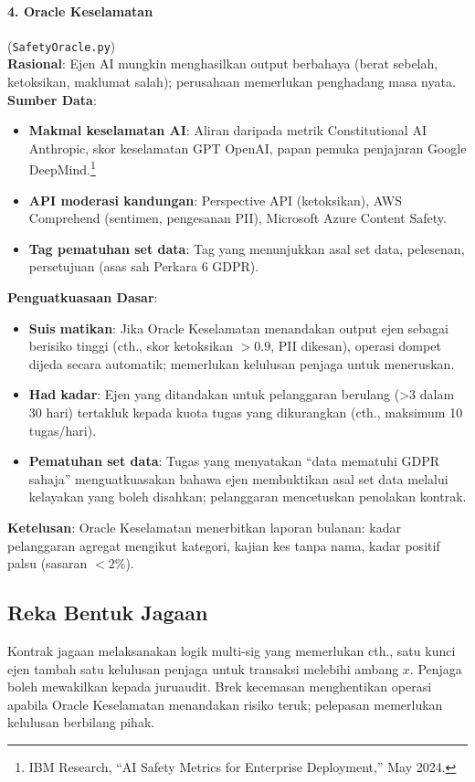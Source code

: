 \documentclass[11pt]{article}
\begin{document}
\paragraph{4. Oracle Keselamatan} (\texttt{SafetyOracle.py})\\
\textbf{Rasional}: Ejen AI mungkin menghasilkan output berbahaya (berat sebelah, ketoksikan, maklumat salah); perusahaan memerlukan penghadang masa nyata.\\
\textbf{Sumber Data}:
\begin{itemize}[noitemsep]
  \item \textbf{Makmal keselamatan AI}: Aliran daripada metrik Constitutional AI Anthropic, skor keselamatan GPT OpenAI, papan pemuka penjajaran Google DeepMind.\footnote{IBM Research, ``AI Safety Metrics for Enterprise Deployment,'' May 2024.}
  \item \textbf{API moderasi kandungan}: Perspective API (ketoksikan), AWS Comprehend (sentimen, pengesanan PII), Microsoft Azure Content Safety.
  \item \textbf{Tag pematuhan set data}: Tag yang menunjukkan asal set data, pelesenan, persetujuan (asas sah Perkara 6 GDPR).
\end{itemize}
\textbf{Penguatkuasaan Dasar}:
\begin{itemize}[noitemsep]
  \item \textbf{Suis matikan}: Jika Oracle Keselamatan menandakan output ejen sebagai berisiko tinggi (cth., skor ketoksikan $>0.9$, PII dikesan), operasi dompet dijeda secara automatik; memerlukan kelulusan penjaga untuk meneruskan.
  \item \textbf{Had kadar}: Ejen yang ditandakan untuk pelanggaran berulang (>3 dalam 30 hari) tertakluk kepada kuota tugas yang dikurangkan (cth., maksimum 10 tugas/hari).
  \item \textbf{Pematuhan set data}: Tugas yang menyatakan ``data mematuhi GDPR sahaja'' menguatkuasakan bahawa ejen membuktikan asal set data melalui kelayakan yang boleh disahkan; pelanggaran mencetuskan penolakan kontrak.
\end{itemize}
\textbf{Ketelusan}: Oracle Keselamatan menerbitkan laporan bulanan: kadar pelanggaran agregat mengikut kategori, kajian kes tanpa nama, kadar positif palsu (sasaran $<2\%$).

\subsection{Reka Bentuk Jagaan}
Kontrak jagaan melaksanakan logik multi-sig yang memerlukan cth., satu kunci ejen tambah satu kelulusan penjaga untuk transaksi melebihi ambang $x$. Penjaga boleh mewakilkan kepada juruaudit. Brek kecemasan menghentikan operasi apabila Oracle Keselamatan menandakan risiko teruk; pelepasan memerlukan kelulusan berbilang pihak.
\end{document}
